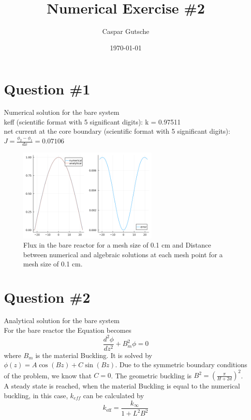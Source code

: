 \documentclass[11pt,a4paper]{article}
\begin{document}
\title{Numerical Exercise \#2}
\author{Caspar Gutsche\\  %
}
\date{\today}
\maketitle



\newpage
\section{Question \#1}
Numerical solution for the bare system \\
keff (scientific format with 5 significant digits): k = 0.97511 \\
net current at the core boundary (scientific format with 5 significant digits): $J = \frac{\phi_{2}-\phi_{1}}{dx}= 0.07106$ \\
\begin{figure}[h]
	\includegraphics[width=7cm]{../figs/ex2/bare.png}
	\centering
	\caption{Flux in the bare reactor for a mesh size of 0.1 cm and Distance between numerical and algebraic solutions at each mesh point for a mesh size of 0.1 cm.}
\end{figure}

\section{Question \#2}
Analytical solution for the bare system\\
For the bare reactor the Equation becomes
$$
\frac{d^2 \phi}{d z^2}+B_m^2 \phi=0
$$
where $B_{m}$ is the material Buckling. 
It is solved by $\phi(z)=A \cos (B z)+C \sin (B z)$. Due to the symmetric boundary conditions of the problem, we know that $C=0$. The geometric buckling is $B^2=\left(\frac{\pi}{H+2 d}\right)^2$.
A steady state is reached, when the material Buckling is equal to the numerical buckling, in this case, $k_{eff}$ can be calculated by
$$
k_{\mathrm{eff}}=\frac{k_{\infty}}{1+L^2 B^2}
$$
\end{document}

